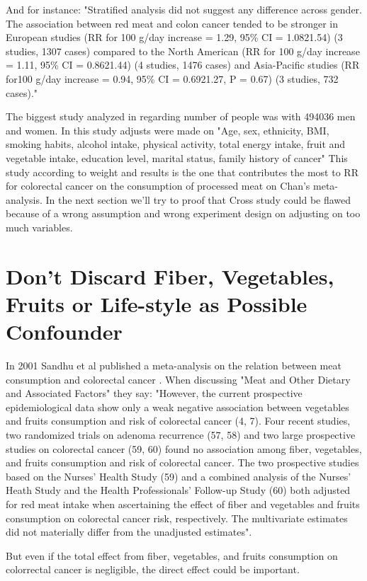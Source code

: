 \documentclass{article}
\begin{document}
And for instance: "Stratified analysis did not suggest any difference across gender. The
association between red meat and colon cancer tended to be stronger
in European studies (RR for 100 g/day increase = 1.29, 95\% CI =
1.0821.54) (3 studies, 1307 cases) compared to the North American
(RR for 100 g/day increase = 1.11, 95\% CI = 0.8621.44) (4 studies, 1476
cases) and Asia-Pacific studies (RR for100 g/day increase = 0.94, 95\% CI =
0.6921.27, P = 0.67) (3 studies, 732 cases)."

The biggest study analyzed in \cite{chan} regarding number of people was \cite{cross} with 494036 men and women. In this study adjusts were made on "Age, sex, ethnicity, BMI, smoking habits, alcohol intake, physical activity, total energy intake, fruit and vegetable intake, education level, marital status, family history of cancer"
This study according to weight and results is the one that contributes the most to RR for colorectal cancer on the consumption of processed meat on Chan's meta-analysis. In the next section we'll try to proof that Cross study could be flawed because of a wrong assumption and wrong experiment design on adjusting on too much variables.



\section{Don't Discard Fiber, Vegetables, Fruits or Life-style as Possible Confounder}
\label{sec:sandhu}
In 2001 Sandhu et al published a meta-analysis on the relation between meat consumption and colorectal cancer \cite{sandhu}. When discussing "Meat and Other Dietary and Associated Factors" they say: "However, the current
prospective epidemiological data show only a weak negative
association between vegetables and fruits consumption and risk
of colorectal cancer (4, 7). Four recent studies, two randomized
trials on adenoma recurrence (57, 58) and two large prospective
studies on colorectal cancer (59, 60) found no association
among fiber, vegetables, and fruits consumption and risk of colorectal cancer. The two prospective studies based on the
Nurses’ Health Study (59) and a combined analysis of the
Nurses’ Heath Study and the Health Professionals’ Follow-up
Study (60) both adjusted for red meat intake when ascertaining
the effect of fiber and vegetables and fruits consumption on
colorectal cancer risk, respectively. The multivariate estimates
did not materially differ from the unadjusted estimates".

But even if the total effect from fiber, vegetables, and fruits consumption on colorrectal cancer is negligible, the direct effect could be important.
\end{document}
